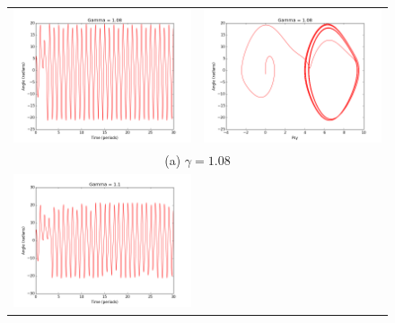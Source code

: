 \documentclass[11pt]{article}
\begin{document}
\begin{figure}[ht]
\begin{tabular}{cc}
\includegraphics[scale=.3]{g08theta.png}&

\includegraphics[scale=.3]{g08psy.png} \\
\multicolumn{2}{c}{(a) $\gamma = 1.08 $} \\[6pt]

\includegraphics[scale=.3]{g1theta.png}&


\end{tabular}
\end{figure}
\end{document}
